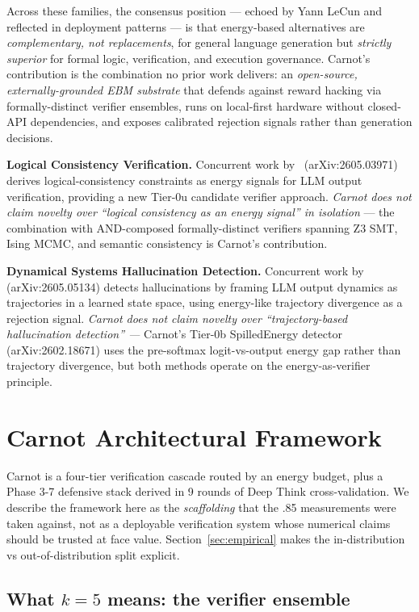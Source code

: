 \documentclass[10pt]{article}
\begin{document}
Across these families, the consensus position --- echoed by Yann
LeCun and reflected in deployment patterns --- is that energy-based
alternatives are \emph{complementary, not replacements}, for general
language generation but \emph{strictly superior} for formal logic,
verification, and execution governance. Carnot's contribution is
the combination no prior work delivers: an \emph{open-source,
externally-grounded EBM substrate} that defends against reward
hacking via formally-distinct verifier ensembles, runs on
local-first hardware without closed-API dependencies, and exposes
calibrated rejection signals rather than generation decisions.

\textbf{Logical Consistency Verification.}
Concurrent work by~\cite{logicalconsistency2026} (arXiv:2605.03971)
derives logical-consistency constraints as energy signals for LLM
output verification, providing a new Tier-0u candidate verifier
approach. \emph{Carnot does not claim novelty over ``logical
consistency as an energy signal'' in isolation} --- the combination
with AND-composed formally-distinct verifiers spanning Z3 SMT,
Ising MCMC, and semantic consistency is Carnot's contribution.

\textbf{Dynamical Systems Hallucination Detection.}
Concurrent work by~\cite{dynhallucination2026} (arXiv:2605.05134)
detects hallucinations by framing LLM output dynamics as trajectories
in a learned state space, using energy-like trajectory divergence as
a rejection signal. \emph{Carnot does not claim novelty over
``trajectory-based hallucination detection'' --- } Carnot's Tier-0b
SpilledEnergy detector (arXiv:2602.18671) uses the pre-softmax
logit-vs-output energy gap rather than trajectory divergence, but
both methods operate on the energy-as-verifier principle.

\section{Carnot Architectural Framework}
\label{sec:framework}

Carnot is a four-tier verification cascade routed by an energy
budget, plus a Phase 3-7 defensive stack derived in 9 rounds of
Deep Think cross-validation. We describe the framework here as the
\emph{scaffolding} that the .85 measurements were taken against,
not as a deployable verification system whose numerical claims
should be trusted at face value. Section~\ref{sec:empirical} makes
the in-distribution vs out-of-distribution split explicit.

\subsection{What \texorpdfstring{$k=5$}{k=5} means: the verifier ensemble}
\label{sec:k5}
\end{document}
